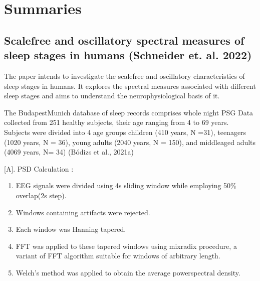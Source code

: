 \documentclass[letterpaper,10pt,english]{sphinxmanual}
\begin{document}
\chapter{Summaries}
\label{\detokenize{summary:summaries}}\label{\detokenize{summary::doc}}

\section{Scale\sphinxhyphen{}free and oscillatory spectral measures of sleep stages in humans (Schneider et. al. 2022)}
\label{\detokenize{summary:scale-free-and-oscillatory-spectral-measures-of-sleep-stages-in-humans-schneider-et-al-2022}}
\sphinxAtStartPar
{}

\sphinxAtStartPar
{}

\sphinxAtStartPar
The paper intends to investigate the scale\sphinxhyphen{}free and oscillatory characteristics of sleep stages in humans. It explores the spectral measures associated with different sleep stages and aims to understand the neurophysiological basis of it.

\sphinxAtStartPar
{}

\sphinxAtStartPar
The Budapest\sphinxhyphen{}Munich database of sleep records comprises whole night PSG Data collected from 251 healthy subjects, their age ranging from 4 to 69 years. Subjects were divided into 4 age groups \sphinxhyphen{} children (4\textendash{}10 years, N =31), teenagers (10\textendash{}20 years, N = 36), young adults (20\textendash{}40 years, N = 150), and middle\sphinxhyphen{}aged adults (40\textendash{}69 years, N= 34) (Bódizs et al., 2021a)

\sphinxAtStartPar
{}

\sphinxAtStartPar
{[}A{]}. PSD Calculation :
\begin{enumerate}
%
\item {} 
\sphinxAtStartPar
EEG signals were divided using 4s sliding window while employing 50\% overlap(2s step).

\item {} 
\sphinxAtStartPar
Windows containing artifacts were rejected.

\item {} 
\sphinxAtStartPar
Each window was Hanning tapered.

\item {} 
\sphinxAtStartPar
FFT was applied to these tapered windows using mix\sphinxhyphen{}radix procedure, a variant of FFT algorithm suitable for windows of arbitrary length.

\item {} 
\sphinxAtStartPar
Welch’s method was applied to obtain the average power\sphinxhyphen{}spectral density.

\end{enumerate}
\end{document}
